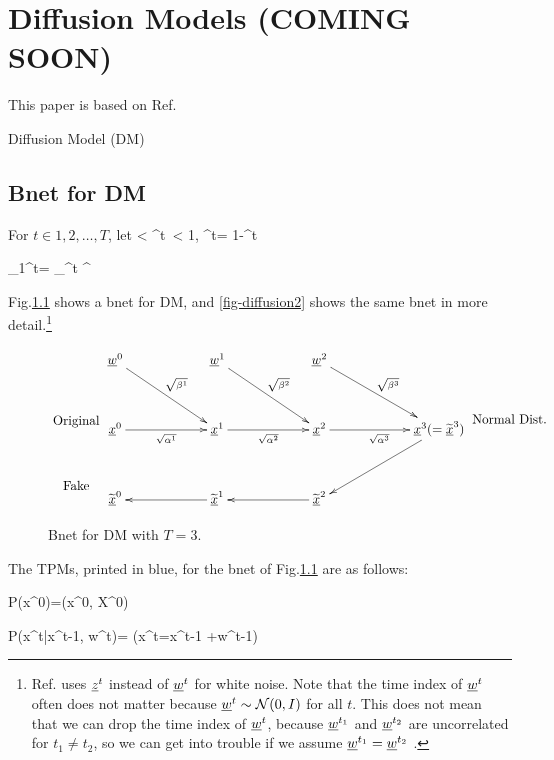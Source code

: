 \chapter{Diffusion Models (COMING SOON)}
\label{ch-diffusion}
\newcommand{\prodalp}[0]{\pi_1^t\alp}

This paper is based on
 Ref.\cite{weng-diffusion-model}

Diffusion Model (DM)

\section{Bnet for DM}

For $t\in 1,2, \ldots , T$, let
< \alp^t\
< 1, \; \beta^t= 1-\alp^t
\eeq

\beq
\prodalp= \prod_{\tau=1}^t \alp^\tau
\eeq

Fig.\ref{fig-diffusion1} shows a
bnet for DM, and  
\ref{fig-diffusion2}
shows the same bnet 
in more detail.\footnote{
Ref.\cite{weng-diffusion-model} uses ${\underline{z}}^{t}$ 
instead of ${\underline{w}}^{t}$
for white noise.
Note that 
the time index
of 
${\underline{w}}^{t}$
often does not matter
because 
${\underline{w}}^{t}\sim {\cal N}(0, I)$
for all $t$.
This does not mean
that we can drop the
time index of ${\underline{w}}^t$,
because ${\underline{w}}^{t_1}$
and ${\underline{w}}^{t_2}$
are uncorrelated for $t_1\neq t_2$,
so we can get into 
trouble if we assume
${\underline{w}}^{t_1}={\underline{w}}^{t_2}$ .
}

\begin{figure}[h!]
$$
\xymatrix@C=5pc@R=3pc{
\\
\text{Original}
\\
\text{Fake}
}
\xymatrix@C=5pc@R=3pc{
\rvw^0\ar[dr]^{\sqrt{\beta^1}}
&\rvw^1\ar[dr]^{\sqrt{\beta^2}}
&\rvw^2\ar[dr]^{\sqrt{\beta^3}}
\\
\rvx^0\ar[r]_{\sqrt{\alp^1}}
&\rvx^1\ar[r]_{\sqrt{\alp^2}}
&\rvx^2\ar[r]_{\sqrt{\alp^3}}
&\rvx^3(= \TIL{\rvx}^3)\ar[dl]
\\
\TIL{\rvx}^0
&\TIL{\rvx}^1\ar[l]
&\TIL{\rvx}^2\ar[l]
&
}
\xymatrix@C=5pc@R=3pc{
\\
\text{Normal Dist.}
}
$$
\caption{Bnet for DM with $T=3$.}
\label{fig-diffusion1}
\end{figure}


The TPMs, printed in blue,
for the bnet of Fig.\ref{fig-diffusion1}
are as follows:

\beq \color{blue}
P(x^0)=\delta(x^0, X^0)
\quad {}
\eeq

\beq \color{blue}
P(x^t|x^{t-1}, w^{t})=
\indi(\quad x^t=\;x^{t-1}
+\;w^{t-1}\quad)
\eeq


